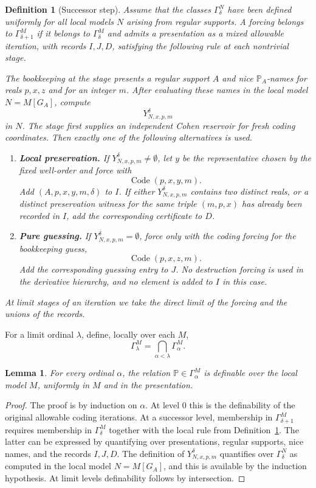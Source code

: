\documentclass{article}
\newtheorem{lemma}[theorem]{Lemma}
\newtheorem{definition}[theorem]{Definition}
\theoremstyle{remark}
\theoremstyle{plain}
\newcommand{\forceP}{\mathbb{P}}
\newcommand{\Code}{\operatorname{Code}}
\begin{document}
\begin{definition}[Successor step]\label{def:gamma_succ}
Assume that the classes $\Gamma^N_\delta$ have been defined uniformly for all
local models $N$ arising from regular supports. A forcing belongs to
$\Gamma^{M}_{\delta+1}$ if it belongs to $\Gamma^M_\delta$ and admits a
presentation as a mixed allowable iteration, with records $I,J,D$, satisfying the
following rule at each nontrivial stage.

The bookkeeping at the stage presents a regular support $A$ and nice
$\forceP_A$-names for reals $p,x,z$ and for an integer $m$. After evaluating
these names in the local model $N=M[G_A]$, compute
\[
   Y^\delta_{N,x,p,m}
\]
in $N$. The stage first supplies an independent Cohen reservoir for fresh coding
coordinates. Then exactly one of the following alternatives is used.

\begin{enumerate}[label=\textup{(\alph*)}]
\item \textbf{Local preservation.}
If $Y^\delta_{N,x,p,m}\neq\emptyset$, let $y$ be the representative chosen by
the fixed well-order and force with
\[
   \Code(p,x,y,m).
\]
Add $(A,p,x,y,m,\delta)$ to $I$. If either
$Y^\delta_{N,x,p,m}$ contains two distinct reals, or a distinct preservation
witness for the same triple $(m,p,x)$ has already been recorded in $I$, add the
corresponding certificate to $D$.

\item \textbf{Pure guessing.}
If $Y^\delta_{N,x,p,m}=\emptyset$, force only with the coding forcing for the
bookkeeping guess,
\[
   \Code(p,x,z,m).
\]
Add the corresponding guessing entry to $J$. No destruction forcing is used in
the derivative hierarchy, and no element is added to $I$ in this case.
\end{enumerate}
At limit stages of an iteration we take the direct limit of the forcing and the
unions of the records.
\end{definition}

For a limit ordinal $\lambda$, define, locally over each $M$,
\[
   \Gamma^M_\lambda=\bigcap_{\alpha<\lambda}\Gamma^M_\alpha.
\]

\begin{lemma}\label{lem:definability}
For every ordinal $\alpha$, the relation $\forceP\in\Gamma^M_\alpha$ is
definable over the local model $M$, uniformly in $M$ and in the presentation.
\end{lemma}

\begin{proof}
The proof is by induction on $\alpha$. At level $0$ this is the definability of
the original allowable coding iterations. At a successor level, membership in
$\Gamma^M_{\delta+1}$ requires membership in $\Gamma^M_\delta$ together with the
local rule from Definition~\ref{def:gamma_succ}. The latter can be expressed by
quantifying over presentations, regular supports, nice names, and the records
$I,J,D$. The definition of $Y^\delta_{N,x,p,m}$ quantifies over
$\Gamma^N_\delta$ as computed in the local model $N=M[G_A]$, and this is
available by the induction hypothesis. At limit levels definability follows by
intersection.
\end{proof}
\end{document}
